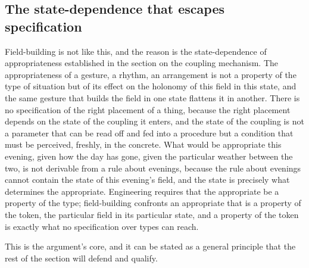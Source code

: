 \subsection{The state-dependence that escapes specification}
\label{p22:sub:eng-state-dependence}

Field-building is not like this, and the reason is the state-dependence of appropriateness established in the section on the coupling mechanism. The appropriateness of a gesture, a rhythm, an arrangement is not a property of the type of situation but of its effect on the holonomy of this field in this state, and the same gesture that builds the field in one state flattens it in another. There is no specification of the right placement of a thing, because the right placement depends on the state of the coupling it enters, and the state of the coupling is not a parameter that can be read off and fed into a procedure but a condition that must be perceived, freshly, in the concrete. What would be appropriate this evening, given how the day has gone, given the particular weather between the two, is not derivable from a rule about evenings, because the rule about evenings cannot contain the state of this evening's field, and the state is precisely what determines the appropriate. Engineering requires that the appropriate be a property of the type; field-building confronts an appropriate that is a property of the token, the particular field in its particular state, and a property of the token is exactly what no specification over types can reach.


This is the argument's core, and it can be stated as a general principle that the rest of the section will defend and qualify.

